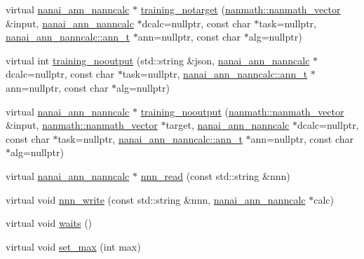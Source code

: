 \begin{DoxyCompactItemize}
\item 
virtual \hyperlink{classnanai_1_1nanai__ann__nanncalc}{nanai\+\_\+ann\+\_\+nanncalc} $\ast$ \hyperlink{classnanai_1_1nanai__ann__nannmgr_a7a28db94886caffa0824206c0e2b2fa9}{training\+\_\+notarget} (\hyperlink{classnanmath_1_1nanmath__vector}{nanmath\+::nanmath\+\_\+vector} \&input, \hyperlink{classnanai_1_1nanai__ann__nanncalc}{nanai\+\_\+ann\+\_\+nanncalc} $\ast$dcalc=nullptr, const char $\ast$task=nullptr, \hyperlink{classnanai_1_1nanai__ann__nanncalc_1_1ann__t}{nanai\+\_\+ann\+\_\+nanncalc\+::ann\+\_\+t} $\ast$ann=nullptr, const char $\ast$alg=nullptr)
\item 
virtual int \hyperlink{classnanai_1_1nanai__ann__nannmgr_aaf7a2da88570d980d6533dbf3417a76c}{training\+\_\+nooutput} (std\+::string \&json, \hyperlink{classnanai_1_1nanai__ann__nanncalc}{nanai\+\_\+ann\+\_\+nanncalc} $\ast$dcalc=nullptr, const char $\ast$task=nullptr, \hyperlink{classnanai_1_1nanai__ann__nanncalc_1_1ann__t}{nanai\+\_\+ann\+\_\+nanncalc\+::ann\+\_\+t} $\ast$ann=nullptr, const char $\ast$alg=nullptr)
\item 
virtual \hyperlink{classnanai_1_1nanai__ann__nanncalc}{nanai\+\_\+ann\+\_\+nanncalc} $\ast$ \hyperlink{classnanai_1_1nanai__ann__nannmgr_a7461a5cad561f578869c850adf1e9639}{training\+\_\+nooutput} (\hyperlink{classnanmath_1_1nanmath__vector}{nanmath\+::nanmath\+\_\+vector} \&input, \hyperlink{classnanmath_1_1nanmath__vector}{nanmath\+::nanmath\+\_\+vector} $\ast$target, \hyperlink{classnanai_1_1nanai__ann__nanncalc}{nanai\+\_\+ann\+\_\+nanncalc} $\ast$dcalc=nullptr, const char $\ast$task=nullptr, \hyperlink{classnanai_1_1nanai__ann__nanncalc_1_1ann__t}{nanai\+\_\+ann\+\_\+nanncalc\+::ann\+\_\+t} $\ast$ann=nullptr, const char $\ast$alg=nullptr)
\item 
virtual \hyperlink{classnanai_1_1nanai__ann__nanncalc}{nanai\+\_\+ann\+\_\+nanncalc} $\ast$ \hyperlink{classnanai_1_1nanai__ann__nannmgr_aa4bf6ea43af41a463213c1620757685a}{nnn\+\_\+read} (const std\+::string \&nnn)
\item 
virtual void \hyperlink{classnanai_1_1nanai__ann__nannmgr_a04ac84eff31dab37e338807a4d44d0b9}{nnn\+\_\+write} (const std\+::string \&nnn, \hyperlink{classnanai_1_1nanai__ann__nanncalc}{nanai\+\_\+ann\+\_\+nanncalc} $\ast$calc)
\item 
virtual void \hyperlink{classnanai_1_1nanai__ann__nannmgr_a41e95105ae57bf782fb5ad3b517c4a6a}{waits} ()
\item 
virtual void \hyperlink{classnanai_1_1nanai__ann__nannmgr_ae0a3866bf95574f3d12543da7a326b08}{set\+\_\+max} (int max)

\end{DoxyCompactItemize}
